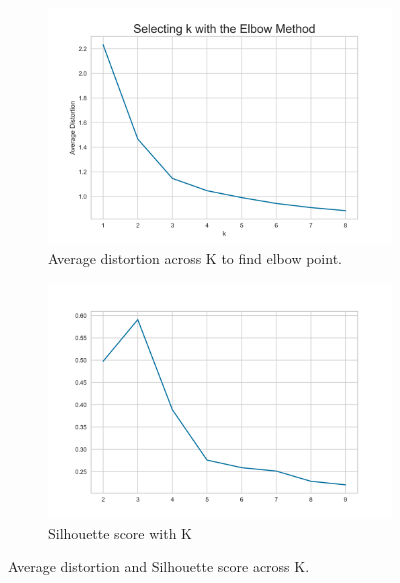 \documentclass[10pt,a4paper]{style}
\begin{document}
		\begin{figure}[h]
			\centering
			\begin{subfigure}[t]{0.49\textwidth}
				\includegraphics[width=\textwidth]{elbow.png}
				\caption{Average distortion across K to find elbow point.}
				\label{fig:elbow}
			\end{subfigure}
			\hfill
			\begin{subfigure}[t]{0.49\textwidth}
				\includegraphics[width=\textwidth]{sil_score.png}
				\caption{Silhouette score with K}
				\label{fig:sil_score}
			\end{subfigure}
			\caption{Average distortion and Silhouette score across K. }
			\label{fig:Average distortion and Silhouette score across K.}
		\end{figure}	
		
\end{document}
